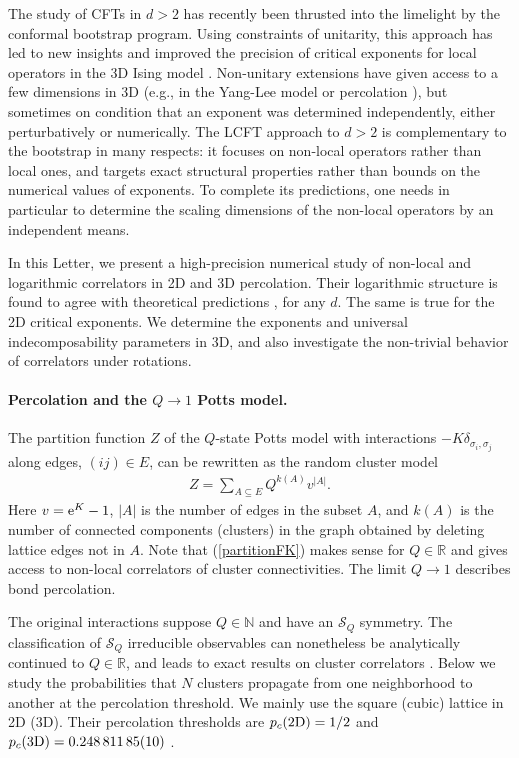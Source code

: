\documentclass[aps,prl,twocolumn,showpacs,superscriptaddress,groupedaddress]{revtex4}  %
\begin{document}
The study of CFTs in $d>2$ has recently been thrusted into the limelight by the conformal bootstrap program. 
Using constraints of unitarity, this approach has
led to new insights and improved the precision of critical exponents for local operators in the 3D Ising model \cite{BootstrapIsing}. Non-unitary extensions have given access to a few dimensions
in 3D (e.g., in the Yang-Lee model \cite{GR} or percolation \cite{LeClair}), but sometimes on condition that an exponent was determined independently, either perturbatively \cite{LeClair} or numerically. The LCFT approach to $d>2$ is complementary to the bootstrap in many respects: it focuses on
non-local operators rather than local ones, and targets exact structural properties rather than bounds on the numerical values of exponents. To complete its
predictions, one needs in particular to determine the scaling dimensions of the non-local operators by an independent means.

In this Letter, we present a high-precision numerical study of non-local and logarithmic correlators in 2D and 3D percolation. 
Their logarithmic structure is found to agree with theoretical predictions \cite{CJV}, for any $d$. The same is true for the 2D critical exponents.
We determine the exponents and universal indecomposability parameters in 3D, and also investigate the non-trivial behavior of correlators under
rotations.

\paragraph{Percolation and the $Q \to 1$ Potts model.}
The partition function $Z$ of the $Q$-state Potts model with
interactions $-K\delta_{\sigma_i,\sigma_j}$ along edges, $(ij) \in E$,
can be rewritten as the random cluster model \cite{FK,Wu1982}
\begin{eqnarray}
Z=\sum_{A\subseteq E}Q^{k(A)}v^{|A|}.
\label{partitionFK}
\end{eqnarray}
Here $v={\rm e}^K-1$, $|A|$ is the number of edges in the subset $A$, and $k(A)$ is
the number of connected components (clusters) in the graph obtained by
deleting lattice edges not in $A$. Note that (\ref{partitionFK}) makes sense for
$Q \in \mathbb{R}$ and gives access to non-local correlators of
cluster connectivities. The limit $Q \to 1$ describes bond percolation.

The original interactions suppose $Q \in \mathbb{N}$ and have an $\mathcal{S}_Q$ symmetry.
The classification of $\mathcal{S}_Q$ irreducible observables can nonetheless be analytically continued to
$Q \in \mathbb{R}$, and leads to exact results on cluster correlators \cite{VJS,VJ,CJV}.
Below we study the probabilities that $N$ clusters propagate from one neighborhood to another at the percolation
threshold. We mainly use the square (cubic) lattice in 2D (3D).
Their percolation thresholds are $p_c (2 {\rm D})=1/2$ \cite{kesten1980} 
and $p_c (3 {\rm D})=0.248 \, 811 \, 85 (10) $ \cite{Lorenz1998,Wang2013,xu2014}. 
\end{document}
